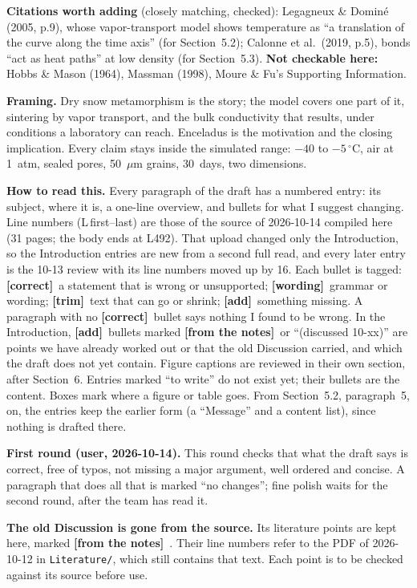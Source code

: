 \documentclass[11pt]{article}
\newcommand{\Note}{\textcolor{open}{\textbf{[from the notes]}}\ }
\newcommand{\tC}{\textcolor{miss}{\textbf{[correct]}}\ }
\newcommand{\tG}{\textcolor{stale}{\textbf{[wording]}}\ }
\newcommand{\tT}{\textcolor{cut}{\textbf{[trim]}}\ }
\newcommand{\tA}{\textcolor{have}{\textbf{[add]}}\ }
\newcommand{\add}[1]{\textcolor{chk}{#1}}
\begin{document}
\add{\textbf{Citations worth adding} (closely matching, checked):
Legagneux \& Domin\'e (2005, p.9), whose vapor-transport model shows
temperature as ``a translation of the curve along the time axis'' (for
Section~5.2); Calonne et al.\ (2019, p.5), bonds ``act as heat paths'' at low
density (for Section~5.3). \textbf{Not checkable here:} Hobbs \& Mason
(1964), Massman (1998), Moure \& Fu's Supporting Information.}


\textbf{Framing.} Dry snow metamorphism is the story; the model covers one
part of it, sintering by vapor transport, and the bulk conductivity that
results, under conditions a laboratory can reach. Enceladus is the motivation
and the closing implication. Every claim stays inside the simulated range:
$-40$ to $-5\,^{\circ}$C, air at 1~atm, sealed pores, 50~$\mu$m grains,
30~days, two dimensions.

\textbf{How to read this.} Every paragraph of the draft has a numbered
entry: its subject, where it is, a one-line overview, and bullets for what I
suggest changing. Line numbers (L\,first--last) are those of the source of
2026-10-14 compiled here (31 pages; the body ends at L492). That upload
changed only the Introduction, so the Introduction entries are new from a
second full read, and every later entry is the 10-13 review with its line
numbers moved up by 16. Each bullet is tagged:
\tC a statement that is wrong or unsupported;
\tG grammar or wording;
\tT text that can go or shrink;
\tA something missing.
A paragraph with no \tC bullet says nothing I found to be wrong. In the
Introduction, \tA bullets marked \Note or ``(discussed 10-xx)'' are points we
have already worked out or that the old Discussion carried, and which the
draft does not yet contain. Figure captions are reviewed in their own
section, after Section~6. Entries
marked ``to write'' do not exist yet; their bullets are the content. Boxes
mark where a figure or table goes. From Section~5.2, paragraph~5, on, the
entries keep the earlier form (a ``Message'' and a content list), since
nothing is drafted there.

\textbf{First round (user, 2026-10-14).} This round checks that what the
draft says is correct, free of typos, not missing a major argument, well
ordered and concise. A paragraph that does all that is marked ``no changes'';
fine polish waits for the second round, after the team has read it.

\textbf{The old Discussion is gone from the source.} Its literature points
are kept here, marked \Note. Their line numbers refer to the PDF of
2026-10-12 in \texttt{Literature/}, which still contains that text. Each
point is to be checked against its source before use.
\end{document}
